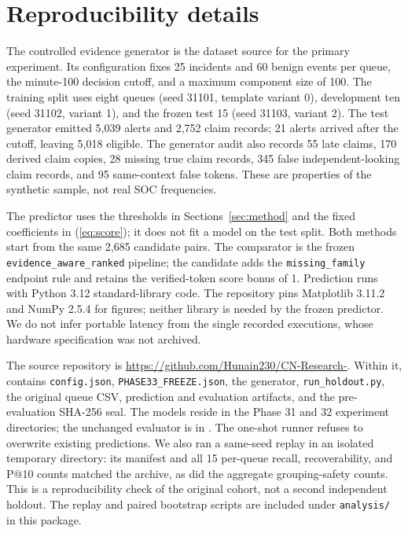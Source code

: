 \section{Reproducibility details}\label{sec:reproduce}
The controlled evidence generator is the dataset source for the primary experiment. Its configuration fixes 25 incidents and 60 benign events per queue, the minute-100 decision cutoff, and a maximum component size of 100. The training split uses eight queues (seed 31101, template variant 0), development ten (seed 31102, variant 1), and the frozen test 15 (seed 31103, variant 2). The test generator emitted 5,039 alerts and 2,752 claim records; 21 alerts arrived after the cutoff, leaving 5,018 eligible. The generator audit also records 55 late claims, 170 derived claim copies, 28 missing true claim records, 345 false independent-looking claim records, and 95 same-context false tokens. These are properties of the synthetic sample, not real SOC frequencies.

The predictor uses the thresholds in Sections~\ref{sec:method} and the fixed coefficients in (\ref{eq:score}); it does not fit a model on the test split. Both methods start from the same 2,685 candidate pairs. The comparator is the frozen \texttt{evidence\_aware\_ranked} pipeline; the candidate adds the \texttt{missing\_family} endpoint rule and retains the verified-token score bonus of 1. Prediction runs with Python 3.12 standard-library code. The repository pins Matplotlib 3.11.2 and NumPy 2.5.4 for figures; neither library is needed by the frozen predictor. We do not infer portable latency from the single recorded executions, whose hardware specification was not archived.

The source repository is \url{https://github.com/Hunain230/CN-Research-}. Within it,  contains \texttt{config.json}, \texttt{PHASE33\_FREEZE.json}, the generator, \texttt{run\_holdout.py}, the original queue CSV, prediction and evaluation artifacts, and the pre-evaluation SHA-256 seal. The models reside in the Phase 31 and 32 experiment directories; the unchanged evaluator is in . The one-shot runner refuses to overwrite existing predictions. We also ran a same-seed replay in an isolated temporary directory: its manifest and all 15 per-queue recall, recoverability, and P@10 counts matched the archive, as did the aggregate grouping-safety counts. This is a reproducibility check of the original cohort, not a second independent holdout. The replay and paired bootstrap scripts are included under \texttt{analysis/} in this package.
